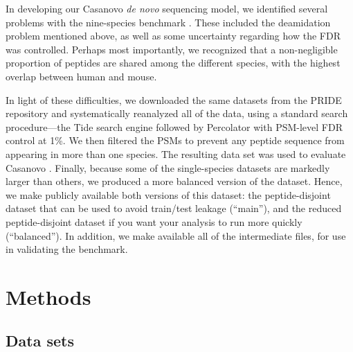 \documentclass{article}
\begin{document}
In developing our Casanovo \textit{de novo} sequencing model, we identified several problems with the nine-species benchmark \cite{yilmaz2024sequence}.
These included the deamidation problem mentioned above, as well as some uncertainty regarding how the FDR was controlled.
Perhaps most importantly, we recognized that a non-negligible proportion of peptides are shared among the different species, with the highest overlap between human and mouse.

In light of these difficulties, we downloaded the same datasets from the PRIDE repository and systematically reanalyzed all of the data, using a standard search procedure---the Tide search engine \cite{diament2011faster} followed by Percolator \cite{kall2007semi-supervised} with PSM-level FDR control at 1\%.
We then filtered the PSMs to prevent any peptide sequence from appearing in more than one species.
The resulting data set was used to evaluate Casanovo \cite{yilmaz2024sequence}.
Finally, because some of the single-species datasets are markedly larger than others, we produced a more balanced version of the dataset.
Hence, we make publicly available both versions of this dataset: the peptide-disjoint dataset that can be used to avoid train/test leakage (``main''), and the reduced peptide-disjoint dataset if you want your analysis to run more quickly (``balanced'').
In addition, we make available all of the intermediate files, for use in validating the benchmark.

\section*{Methods}

\subsection*{Data sets}

\end{document}
